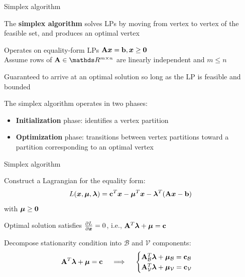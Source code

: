 \documentclass[11pt,compress,t,notes=noshow, xcolor=table]{beamer}
\begin{document}
\begin{framei}[sep=L]{Simplex algorithm}
\item The \textbf{simplex algorithm} solves LPs by moving from vertex to vertex of the feasible set, and produces an optimal vertex
\item Operates on equality-form LPs $\mathbf{A}\bm{x} = \mathbf{b}, \bm{x} \ge \mathbf{0}$\\
Assume rows of $\Amat \in \R^{m \times n}$ are linearly independent and $m \le n$
\item Guaranteed to arrive at an optimal solution so long as the LP is feasible and bounded
\item The simplex algorithm operates in two phases:
\begin{itemize}
\item \textbf{Initialization} phase: identifies a vertex partition
\item \textbf{Optimization} phase: transitions between vertex partitions toward a partition corresponding to an optimal vertex
\end{itemize}
\end{framei}


\begin{framei}{Simplex algorithm}
\item Construct a Lagrangian for the equality form:
$$L(\bm{x}, \bm{\mu}, \bm{\lambda}) = \mathbf{c}^T\bm{x} - \bm{\mu}^T\bm{x} - \bm{\lambda}^T(\mathbf{A}\bm{x} - \mathbf{b})$$
with $\bm{\mu} \ge \mathbf{0}$
\item Optimal solution satisfies $\frac{\partial L}{\partial \bm{x}}=0$, i.e., $\mathbf{A}^T \bm{\lambda} + \bm{\mu} = \mathbf{c}$
\item Decompose stationarity condition into $\mathcal{B}$ and $\mathcal{V}$ components:
$$
\mathbf{A}^T \bm{\lambda} + \bm{\mu} = \mathbf{c} 
\quad \implies \quad
\begin{cases}
\mathbf{A}_{\mathcal{B}}^T \bm{\lambda} + \bm{\mu}_{\mathcal{B}} = \mathbf{c}_{\mathcal{B}} \\
\mathbf{A}_{\mathcal{V}}^T \bm{\lambda} + \bm{\mu}_{\mathcal{V}} = \mathbf{c}_{\mathcal{V}}
\end{cases}
$$
\end{framei}
\end{document}
